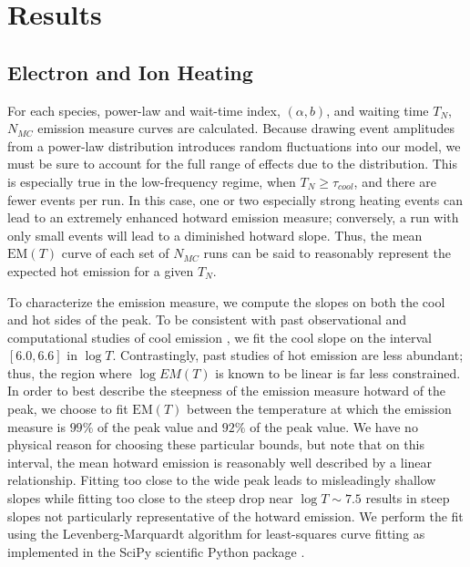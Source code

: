 \documentclass[tighten,apj]{emulateapj}
\begin{document}
	\section{Results}
	\label{sec:results}
	\subsection{Electron and Ion Heating}
	\label{subsec:electron_ion_heating}
	\par For each species, power-law and wait-time index, $(\alpha,b)$, and waiting time $T_N$, $N_{MC}$ emission measure curves are calculated. Because drawing event amplitudes from a power-law distribution introduces random fluctuations into our model, we must be sure to account for the full range of effects due to the distribution. This is especially true in the low-frequency regime, when $T_N\ge\tau_{cool}$, and there are fewer events per run. In this case, one or two especially strong heating events can lead to an extremely enhanced hotward emission measure; conversely, a run with only small events will lead to a diminished hotward slope. Thus, the mean $\mathrm{EM}(T)$ curve of each set of $N_{MC}$ runs can be said to reasonably represent the expected hot emission for a given $T_N$.
	\par To characterize the emission measure, we compute the slopes on both the cool and hot sides of the peak. To be consistent with past observational and computational studies of cool emission \citep[see][and references therein]{bradshaw_diagnosing_2012}, we fit the cool slope on the interval $[6.0,6.6]$ in $\log{T}$. Contrastingly, past studies of hot emission are less abundant; thus, the region where $\log{EM(T)}$ is known to be linear is far less constrained. In order to best describe the steepness of the emission measure hotward of the peak, we choose to fit $\mathrm{EM}(T)$ between the temperature at which the emission measure is $99\%$ of the peak value and $92\%$ of the peak value. We have no physical reason for choosing these particular bounds, but note that on this interval, the mean hotward emission is reasonably well described by a linear relationship. Fitting too close to the wide peak leads to misleadingly shallow slopes while fitting too close to the steep drop near $\log{T}\sim7.5$ results in steep slopes not particularly representative of the hotward emission. We perform the fit using the Levenberg-Marquardt algorithm for least-squares curve fitting as implemented in the SciPy scientific Python package \citep{van_der_walt_numpy_2011}.
\end{document}
